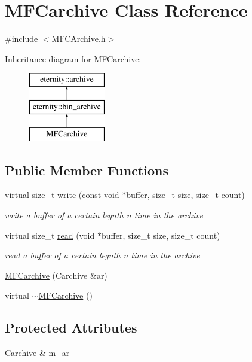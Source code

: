 \hypertarget{class_m_f_carchive}{}\section{M\+F\+Carchive Class Reference}
\label{class_m_f_carchive}


{\ttfamily \#include $<$M\+F\+C\+Archive.\+h$>$}

Inheritance diagram for M\+F\+Carchive\+:\begin{figure}[H]
\begin{center}
\leavevmode
\includegraphics[height=3.000000cm]{class_m_f_carchive}
\end{center}
\end{figure}
\subsection*{Public Member Functions}
\begin{DoxyCompactItemize}
\item 
virtual size\+\_\+t \hyperlink{class_m_f_carchive_a8c5191701a84b9a4d2812887cfc28651}{write} (const void $\ast$buffer, size\+\_\+t size, size\+\_\+t count)
\begin{DoxyCompactList}\small\item\em write a buffer of a certain legnth n time in the archive \end{DoxyCompactList}\item 
virtual size\+\_\+t \hyperlink{class_m_f_carchive_a175a083e8f81fe490714be920539f7b9}{read} (void $\ast$buffer, size\+\_\+t size, size\+\_\+t count)
\begin{DoxyCompactList}\small\item\em read a buffer of a certain legnth n time in the archive \end{DoxyCompactList}\item 
\hyperlink{class_m_f_carchive_adf62fabd21e51cf0f9e1a50fc0367201}{M\+F\+Carchive} (Carchive \&ar)
\item 
virtual \hyperlink{class_m_f_carchive_aa328aff9303e279909cc3855019fdd73}{$\sim$\+M\+F\+Carchive} ()
\end{DoxyCompactItemize}
\subsection*{Protected Attributes}
\begin{DoxyCompactItemize}
\item 
Carchive \& \hyperlink{class_m_f_carchive_a57d8f21676284f6004ce3ca11b573c05}{m\+\_\+ar}
\end{DoxyCompactItemize}

